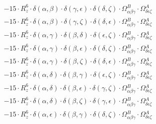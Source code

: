 \documentclass{article}
\begin{document}
\begin{equation}
\begin{array}{c}
 \\[0.2em] 		 - 15 \cdot R_{z}^{6} \cdot \delta{}\left(\alpha{}, \beta{}\right) \cdot \delta{}\left(\gamma{}, \epsilon{}\right) \cdot \delta{}\left(\delta{}, \zeta{}\right) \cdot \Omega{}^{B}_{\alpha{}\beta{}\gamma{}} \cdot \Omega{}^{A}_{\delta{}\epsilon{}\zeta{}} 
 \\[0.2em] 		 - 15 \cdot R_{z}^{6} \cdot \delta{}\left(\alpha{}, \beta{}\right) \cdot \delta{}\left(\gamma{}, \zeta{}\right) \cdot \delta{}\left(\delta{}, \epsilon{}\right) \cdot \Omega{}^{B}_{\alpha{}\beta{}\gamma{}} \cdot \Omega{}^{A}_{\delta{}\epsilon{}\zeta{}} 
 \\[0.2em] 		 - 15 \cdot R_{z}^{6} \cdot \delta{}\left(\alpha{}, \gamma{}\right) \cdot \delta{}\left(\beta{}, \delta{}\right) \cdot \delta{}\left(\epsilon{}, \zeta{}\right) \cdot \Omega{}^{B}_{\alpha{}\beta{}\gamma{}} \cdot \Omega{}^{A}_{\delta{}\epsilon{}\zeta{}} 
 \\[0.2em] 		 - 15 \cdot R_{z}^{6} \cdot \delta{}\left(\alpha{}, \gamma{}\right) \cdot \delta{}\left(\beta{}, \epsilon{}\right) \cdot \delta{}\left(\delta{}, \zeta{}\right) \cdot \Omega{}^{B}_{\alpha{}\beta{}\gamma{}} \cdot \Omega{}^{A}_{\delta{}\epsilon{}\zeta{}} 
 \\[0.2em] 		 - 15 \cdot R_{z}^{6} \cdot \delta{}\left(\alpha{}, \gamma{}\right) \cdot \delta{}\left(\beta{}, \zeta{}\right) \cdot \delta{}\left(\delta{}, \epsilon{}\right) \cdot \Omega{}^{B}_{\alpha{}\beta{}\gamma{}} \cdot \Omega{}^{A}_{\delta{}\epsilon{}\zeta{}} 
 \\[0.2em] 		 - 15 \cdot R_{z}^{6} \cdot \delta{}\left(\alpha{}, \delta{}\right) \cdot \delta{}\left(\beta{}, \gamma{}\right) \cdot \delta{}\left(\epsilon{}, \zeta{}\right) \cdot \Omega{}^{B}_{\alpha{}\beta{}\gamma{}} \cdot \Omega{}^{A}_{\delta{}\epsilon{}\zeta{}} 
 \\[0.2em] 		 - 15 \cdot R_{z}^{6} \cdot \delta{}\left(\alpha{}, \delta{}\right) \cdot \delta{}\left(\beta{}, \epsilon{}\right) \cdot \delta{}\left(\gamma{}, \zeta{}\right) \cdot \Omega{}^{B}_{\alpha{}\beta{}\gamma{}} \cdot \Omega{}^{A}_{\delta{}\epsilon{}\zeta{}} 
 \\[0.2em] 		 - 15 \cdot R_{z}^{6} \cdot \delta{}\left(\alpha{}, \delta{}\right) \cdot \delta{}\left(\beta{}, \zeta{}\right) \cdot \delta{}\left(\gamma{}, \epsilon{}\right) \cdot \Omega{}^{B}_{\alpha{}\beta{}\gamma{}} \cdot \Omega{}^{A}_{\delta{}\epsilon{}\zeta{}} 
 \\[0.2em] 		 - 15 \cdot R_{z}^{6} \cdot \delta{}\left(\alpha{}, \epsilon{}\right) \cdot \delta{}\left(\beta{}, \gamma{}\right) \cdot \delta{}\left(\delta{}, \zeta{}\right) \cdot \Omega{}^{B}_{\alpha{}\beta{}\gamma{}} \cdot \Omega{}^{A}_{\delta{}\epsilon{}\zeta{}} 

\end{array}
\end{equation}
\end{document}
